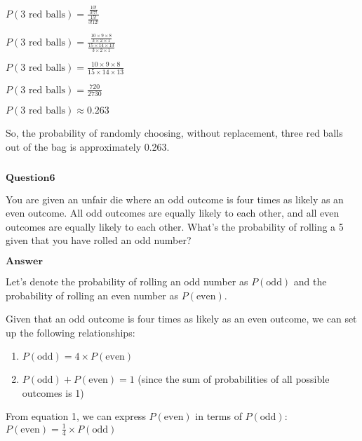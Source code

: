\documentclass[11pt]{article}
\makeatletter
\providecommand{\tightlist}{%
      \setlength{\itemsep}{0pt}\setlength{\parskip}{0pt}}
\newcommand{\boxspacing}{\kern\kvtcb@left@rule\kern\kvtcb@boxsep}
\newcommand{\prompt}[4]{
        {\ttfamily\llap{{\color{#2}[#3]:\hspace{3pt}#4}}\vspace{-\baselineskip}}
    }
\makeatother
\begin{document}
$ P(\text{3 red balls}) = \frac{\frac{10!}{3!7!}}{\frac{15!}{3!12!}} $

$ P(\text{3 red balls}) =
\frac{\frac{10 \times 9 \times 8}{3 \times 2 \times 1}}{\frac{15 \times 14 \times 13}{3 \times 2 \times 1}}
$

$ P(\text{3 red balls}) =
\frac{10 \times 9 \times 8}{15 \times 14 \times 13} $

$ P(\text{3 red balls}) = \frac{720}{2730} $

$ P(\text{3 red balls}) \approx 0.263 $

So, the probability of randomly choosing, without replacement, three red
balls out of the bag is approximately 0.263.

    \begin{tcolorbox}[breakable, size=fbox, boxrule=1pt, pad at break*=1mm,colback=cellbackground, colframe=cellborder]
\prompt{In}{incolor}{ }{\boxspacing}
\begin{Verbatim}[commandchars=\\\{\}]

\end{Verbatim}
\end{tcolorbox}

    $\textbf{Question6}$

You are given an unfair die where an odd outcome is four times as likely
as an even outcome. All odd outcomes are equally likely to each other,
and all even outcomes are equally likely to each other. What's the
probability of rolling a 5 given that you have rolled an odd number?

$\textbf{Answer}$

    Let's denote the probability of rolling an odd number as $
P(\text{odd}) $ and the probability of rolling an even number as $
P(\text{even}) $.

Given that an odd outcome is four times as likely as an even outcome, we
can set up the following relationships:

\begin{enumerate}
\def\labelenumi{\arabic{enumi}.}
\tightlist
\item
  $ P(\text{odd}) = 4 \times P(\text{even}) $
\item
  $ P(\text{odd}) + P(\text{even}) = 1 $ (since the sum of
  probabilities of all possible outcomes is 1)
\end{enumerate}

From equation 1, we can express $ P(\text{even}) $ in terms of $
P(\text{odd}) $: $ P(\text{even}) = \frac{1}{4} \times P(\text{odd})
$
\end{document}
